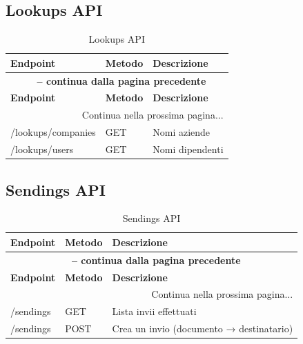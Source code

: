 \documentclass[a4paper,11pt]{article}
\begin{document}
\subsection{Lookups API}
\begin{longtable}{|p{4cm}|p{2cm}|p{7cm}|}
\caption{Lookups API}\label{tab:lookups_api}\\
\hline
\rowcolor{primaryblue!40}
\textbf{Endpoint} & \textbf{Metodo} & \textbf{Descrizione} \\
\hline
\endfirsthead

\multicolumn{3}{c}{{\bfseries \tablename\ \thetable{} -- continua dalla pagina precedente}}\\
\hline
\rowcolor{primaryblue!40}
\textbf{Endpoint} & \textbf{Metodo} & \textbf{Descrizione} \\
\hline
\endhead

\hline
\multicolumn{3}{|r|}{{Continua nella prossima pagina...}}\\
\hline
\endfoot

\hline
\endlastfoot

/lookups/companies & GET & Nomi aziende \\
\hline
/lookups/users & GET & Nomi dipendenti \\
\hline
\end{longtable}


\subsection{Sendings API}
\begin{longtable}{|p{4cm}|p{2cm}|p{7cm}|}
\caption{Sendings API}\label{tab:sendings_api}\\
\hline
\rowcolor{primaryblue!40}
\textbf{Endpoint} & \textbf{Metodo} & \textbf{Descrizione} \\
\hline
\endfirsthead

\multicolumn{3}{c}{{\bfseries \tablename\ \thetable{} -- continua dalla pagina precedente}}\\
\hline
\rowcolor{primaryblue!40}
\textbf{Endpoint} & \textbf{Metodo} & \textbf{Descrizione} \\
\hline
\endhead

\hline
\multicolumn{3}{|r|}{{Continua nella prossima pagina...}}\\
\hline
\endfoot

\hline
\endlastfoot

/sendings & GET & Lista invii effettuati \\
\hline
/sendings & POST & Crea un invio (documento → destinatario) \\
\hline
\end{longtable}
\end{document}
